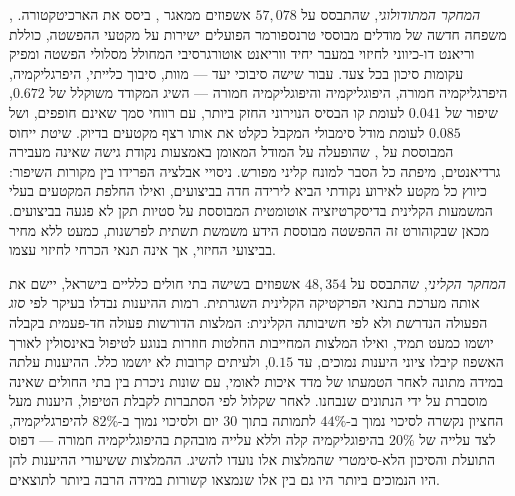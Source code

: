 \emph{המחקר המתודולוגי}, שהתבסס על $57{,}078$ אשפוזים ממאגר , ביסס את הארכיטקטורה. , משפחה חדשה של מודלים מבוססי טרנספורמר הפועלים ישירות על מקטעי ההפשטה, כוללת וריאנט דו-כיווני לחיזוי במעבר יחיד ווריאנט אוטורגרסיבי המחולל מסלולי הפשטה ומפיק עקומות סיכון בכל צעד. עבור שישה סיבוכי יעד --- מוות, סיבוך כלייתי, היפרגליקמיה, היפרגליקמיה חמורה, היפוגליקמיה והיפוגליקמיה חמורה --- השיג המקודד  משוקלל של $0.672$, שיפור של $0.041$ לעומת קו הבסיס הנוירוני החזק ביותר, עם רווחי סמך שאינם חופפים, ושל $0.085$ לעומת מודל סימבולי המקבל כקלט את אותו רצף מקטעים בדיוק. שיטת ייחוס המבוססת על , שהופעלה על המודל המאומן באמצעות נקודת גישה שאינה מעבירה גרדיאנטים, מיפתה כל הסבר למונח קליני מפורש. ניסויי אבלציה הפרידו בין מקורות השיפור: כיווץ כל מקטע לאירוע נקודתי הביא לירידה חדה בביצועים, ואילו החלפת המקטעים בעלי המשמעות הקלינית בדיסקרטיזציה אוטומטית המבוססת על סטיות תקן לא פגעה בביצועים. מכאן שבקוהורט זה ההפשטה מבוססת הידע משמשת תשתית לפרשנות, כמעט ללא מחיר בביצועי החיזוי, אך אינה תנאי הכרחי לחיזוי עצמו.

\emph{המחקר הקליני}, שהתבסס על $48{,}354$ אשפוזים בשישה בתי חולים כלליים בישראל, יישם את אותה מערכת בתנאי הפרקטיקה הקלינית השגרתית. רמות ההיענות נבדלו בעיקר לפי \emph{סוג} הפעולה הנדרשת ולא לפי חשיבותה הקלינית: המלצות הדורשות פעולה חד-פעמית בקבלה יושמו כמעט תמיד, ואילו המלצות המחייבות החלטות חוזרות בנוגע לטיפול באינסולין לאורך האשפוז קיבלו ציוני היענות נמוכים, עד $0.15$, ולעיתים קרובות לא יושמו כלל. ההיענות עלתה במידה מתונה לאחר הטמעתו של מדד איכות לאומי, עם שונות ניכרת בין בתי החולים שאינה מוסברת על ידי הנתונים שנבחנו. לאחר שקלול לפי הסתברות לקבלת הטיפול, היענות מעל החציון נקשרה לסיכוי נמוך ב-$44\%$ לתמותה בתוך $30$ יום ולסיכוי נמוך ב-$82\%$ להיפרגליקמיה, לצד עלייה של $20\%$ בהיפוגליקמיה קלה וללא עלייה מובהקת בהיפוגליקמיה חמורה --- דפוס התועלת והסיכון הלא-סימטרי שהמלצות אלו נועדו להשיג. ההמלצות ששיעורי ההיענות להן היו הנמוכים ביותר היו גם בין אלו שנמצאו קשורות במידה הרבה ביותר לתוצאים.

